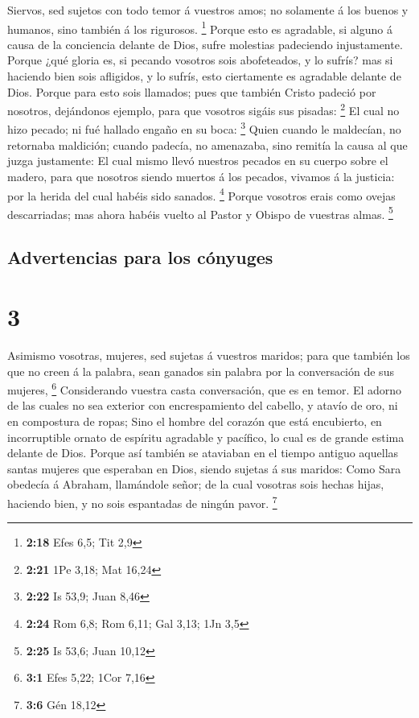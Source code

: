  Siervos, sed sujetos con todo temor á vuestros amos; no
solamente á los buenos y humanos, sino también á los rigurosos.
\footnote{\textbf{2:18} Efes 6,5; Tit 2,9}  Porque esto
es agradable, si alguno á causa de la conciencia delante de Dios, sufre
molestias padeciendo injustamente.  Porque ¿qué gloria
es, si pecando vosotros sois abofeteados, y lo sufrís? mas si haciendo
bien sois afligidos, y lo sufrís, esto ciertamente es agradable delante
de Dios.  Porque para esto sois llamados; pues que
también Cristo padeció por nosotros, dejándonos ejemplo, para que
vosotros sigáis sus pisadas: \footnote{\textbf{2:21} 1Pe 3,18; Mat 16,24}
 El cual no hizo pecado; ni fué hallado engaño en su
boca: \footnote{\textbf{2:22} Is 53,9; Juan 8,46}  Quien
cuando le maldecían, no retornaba maldición; cuando padecía, no
amenazaba, sino remitía la causa al que juzga justamente:
 El cual mismo llevó nuestros pecados en su cuerpo sobre
el madero, para que nosotros siendo muertos á los pecados, vivamos á la
justicia: por la herida del cual habéis sido sanados. \footnote{\textbf{2:24}
  Rom 6,8; Rom 6,11; Gal 3,13; 1Jn 3,5}  Porque vosotros
erais como ovejas descarriadas; mas ahora habéis vuelto al Pastor y
Obispo de vuestras almas. \footnote{\textbf{2:25} Is 53,6; Juan 10,12}

\hypertarget{advertencias-para-los-cuxf3nyuges}{%
\subsection{Advertencias para los
cónyuges}\label{advertencias-para-los-cuxf3nyuges}}

\hypertarget{section-2}{%
\section{3}\label{section-2}}

 Asimismo vosotras, mujeres, sed sujetas á vuestros
maridos; para que también los que no creen á la palabra, sean ganados
sin palabra por la conversación de sus mujeres, \footnote{\textbf{3:1}
  Efes 5,22; 1Cor 7,16}  Considerando vuestra casta
conversación, que es en temor.  El adorno de las cuales no
sea exterior con encrespamiento del cabello, y atavío de oro, ni en
compostura de ropas;  Sino el hombre del corazón que está
encubierto, en incorruptible ornato de espíritu agradable y pacífico, lo
cual es de grande estima delante de Dios.  Porque así
también se ataviaban en el tiempo antiguo aquellas santas mujeres que
esperaban en Dios, siendo sujetas á sus maridos:  Como
Sara obedecía á Abraham, llamándole señor; de la cual vosotras sois
hechas hijas, haciendo bien, y no sois espantadas de ningún pavor.
\footnote{\textbf{3:6} Gén 18,12}

